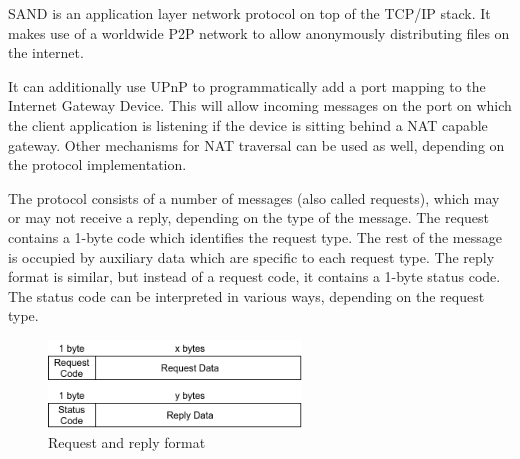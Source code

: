SAND is an application layer network protocol on top of the TCP/IP stack. It 
makes use of a worldwide P2P network to allow anonymously distributing files on 
the internet.

It can additionally use UPnP to programmatically add a port mapping to the 
Internet Gateway Device. This will allow incoming messages on the port on which 
the client application is listening if the device is sitting behind a NAT 
capable gateway. Other mechanisms for NAT traversal can be used as well, 
depending on the protocol implementation.

The protocol consists of a number of messages (also called requests), which may 
or may not receive a reply, depending on the type of the message. The request 
contains a 1-byte code which identifies the request type. The rest of the 
message is occupied by auxiliary data which are specific to each request type. 
The reply format is similar, but instead of a request code, it contains a 
1-byte status code. The status code can be interpreted in various ways, 
depending on the request type.

\begin{figure}[H]
    \centering
    \includegraphics[width=0.6\textwidth]{figures/fig1}
    \caption{Request and reply format}
    \label{fig:fig1}
\end{figure}
